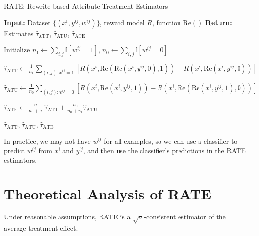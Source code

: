 \documentclass{article}
\begin{document}
\begin{algorithm}[H]
  \caption{RATE: Rewrite-based Attribute Treatment Estimators}
  \label{alg:rate}
  \begin{algorithmic}[1]
  \State \textbf{Input:} Dataset $\{(x^i, y^{ij}, w^{ij})\}$, reward model $R$, function $\text{Re}()$
  \State \textbf{Return:} Estimates $\hat{\tau}_{\text{ATT}}$, $\hat{\tau}_{\text{ATU}}$, $\hat{\tau}_{\text{ATE}}$
  
  \State Initialize $n_1 \leftarrow \sum_{i,j} \mathbb{I}[w^{ij} = 1]$, $n_0 \leftarrow \sum_{i,j} \mathbb{I}[w^{ij} = 0]$
  
  \State $\hat{\tau}_{\text{ATT}} \leftarrow \frac{1}{n_1} \sum\limits_{(i,j): w^{ij} = 1} [R(x^i, \text{Re}(\text{Re}(x^i, y^{ij}, 0), 1)) - R(x^i, \text{Re}(x^i, y^{ij}, 0))]$
  
  \State $\hat{\tau}_{\text{ATU}} \leftarrow \frac{1}{n_0} \sum\limits_{(i,j): w^{ij} = 0} [R(x^i, \text{Re}(x^i, y^{ij}, 1)) - R(x^i, \text{Re}(\text{Re}(x^i, y^{ij}, 1), 0))]$
  
  \State $\hat{\tau}_{\text{ATE}} \leftarrow \frac{n_1}{n_0 + n_1} \hat{\tau}_{\text{ATT}} + \frac{n_0}{n_0 + n_1} \hat{\tau}_{\text{ATU}}$
  
  \State \Return $\hat{\tau}_{\text{ATT}}$, $\hat{\tau}_{\text{ATU}}$, $\hat{\tau}_{\text{ATE}}$
  \end{algorithmic}
\end{algorithm}
In practice, we may not have $w^{ij}$ for all examples, so we can use a classifier to predict $w^{ij}$ from $x^i$ and $y^{ij}$, and then use the classifier's predictions in the RATE estimators.
  
\section{Theoretical Analysis of RATE}
\label{sec:theory}

Under reasonable assumptions, RATE is a $\sqrt{n}$-consistent estimator of the average treatment effect.
\end{document}
